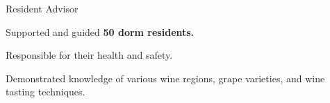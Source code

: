 {
	{Resident Advisor} \hfill{}\newline
}
{
	\item{Supported and guided \textbf{50 dorm residents.}}
	\item{Responsible for their health and safety.}
}

{
}
{\item{Demonstrated knowledge of various wine regions, grape varieties, and wine tasting techniques.}}


